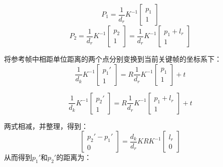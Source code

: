 \begin{equation}
	P_1 = \frac{1}{d_r} K^{-1}  
	\left[ 
	\begin{array}{c}
		p_1 \\
		1
	\end{array}
	\right]
\end{equation}
\begin{equation}
	P_2 
	= 
	\frac{1}{d_r} K^{-1}  
	\left[
	\begin{array}{c}
	p_2\\
	1
	\end{array}
	\right]
	= \frac{1}{d_r} K^{-1}  
	\left[
	\begin{array}{c}
	p_1 + l_r\\
	1
	\end{array}
	\right]
\end{equation}

将参考帧中相距单位距离的两个点分别变换到当前关键帧的坐标系下：
\begin{equation}
	\frac{1}{d_k}K^{-1} 
	\left[
		\begin{array}{c}
			p_1' \\
			1
		\end{array}
	\right] 
	= R \frac{1}{d_r} K^{-1} 
	\left[
		\begin{array}{c}
			p_1 \\
			1
		\end{array}
	\right]
	+ t
\end{equation}

\begin{equation}
\frac{1}{d_k}K^{-1} 
\left[
\begin{array}{c}
p_2' \\
1
\end{array}
\right] 
= R \frac{1}{d_r} K^{-1} 
\left[
\begin{array}{c}
p_1  + l_r\\
1
\end{array}
\right]
+ t
\end{equation}

两式相减，并整理，得到：
\begin{equation}
	\left[
		\begin{array}{c}
			p_2' - p_1'\\
			0
		\end{array}
	\right]
	=
	\frac{d_k}{d_r}KRK^{-1}	
	\left[
		\begin{array}{c}
			l_r \\
			0
		\end{array}
	\right]
\end{equation}
从而得到$p_1'$和$p_2'$的距离为：

